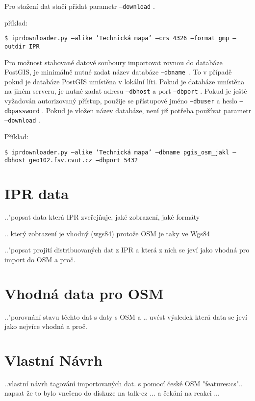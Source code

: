 Pro stažení dat stačí přidat parametr {\tt --download} .

příklad:

{\tt \$ iprdownloader.py ---alike 'Technická mapa' ---crs 4326 ---format gmp ---outdir IPR}

Pro možnost stahované datové souboury importovat rovnou do databáze PostGIS, je 
minimálně nutné zadat název databáze {\tt ---dbname }. To v případě pokud je
databáze PostGIS umístěna v lokální líti. Pokud je databáze umístěna na jiném
serveru, je nutné zadat adresu {\tt ---dbhost} a port {\tt ---dbport} . Pokud je
ještě vyžadován autorizovaný přístup, použije se přístupové jméno {\tt ---dbuser} a
heslo {\tt ---dbpassword} . 
Pokud je vložen název databáze, není již potřeba používat parametr {\tt ---download} .

Příklad:

{\tt \$ iprdownloader.py ---alike 'Technická mapa' ---dbname pgis\_osm\_jakl ---dbhost geo102.fsv.cvut.cz  ---dbport 5432 } 
 

\section{IPR data}
\label{IPR data}
.."popsat data která IPR zveřejňuje, jaké zobrazení, jaké formáty

.. který zobrazení je vhodný (wgs84) protože OSM je taky ve Wgs84

.."popsat projití distribuovaných dat z IPR a která z nich se jeví jako vhodná 
pro import do OSM a proč.

\section{Vhodná data pro OSM}
\label{Vhodná data pro OSM}
.."porovnání stavu těchto dat s daty s OSM a .. uvést výsledek která data se 
jeví jako nejvíce vhodná a proč.

\section{Vlastní Návrh}
\label{Vlastní Návrh}
..vlastní návrh tagování importovaných dat. s pomocí české OSM "features:cs"..
napsat že to bylo vnešeno do diskuze na talk-cz ... a čekání na reakci ...
 




